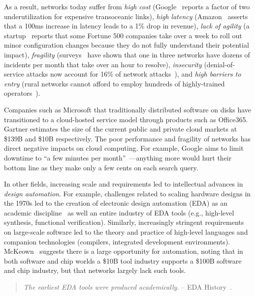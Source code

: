 As a result, networks today suffer from {\em high cost} (Google~\cite{b4} reports a factor of two underutilization for expensive transoceanic links), {\em high latency} (Amazon~\cite{amazon} asserts that a 100ms increase in latency leads to a 1\% drop in revenue), {\em lack of agility} (a startup~\cite{mahajan} reports that some Fortune 500 companies take over a week to roll out minor configuration changes because they do not fully understand their potential impact), {\em fragility} (surveys~\cite{atpg} have shown that one in three networks have dozens of incidents per month that take over an hour to resolve), {\em insecurity} (denial-of-service attacks now account for 16\% of network attacks~\cite{calyptix}), and {\em high barriers to entry} (rural networks cannot afford to employ hundreds of highly-trained operators~\cite{barathwisp}).

Companies such as Microsoft that traditionally distributed software on disks have transitioned to a cloud-hosted service model through products such as Office365. Gartner estimates the size of the current public and private cloud markets at \$139B and \$10B respectively. The poor performance and fragility of networks has direct negative impacts on cloud computing. For example, Google aims to limit downtime to ``a few minutes per month''~\cite{rameshgoogle}---anything more would hurt their bottom line as they make only a few cents on each search query. 

In other fields, increasing scale and requirements led to intellectual advances in \emph{design automation}. For example, challenges related to scaling hardware designs in the 1970s led to the creation of electronic design automation (EDA) as an academic discipline~\cite{alberto} as well an entire industry of EDA tools (e.g., high-level synthesis, functional verification). Similarly, increasingly stringent requirements on large-scale software led to the theory and practice of high-level languages and companion technologies (compilers, integrated development environments).   McKeown~\cite{mckeown} suggests there is a large opportunity for automation, noting that in both software and chip worlds a \$10B tool industry supports a \$100B software and chip industry, but that networks largely lack such tools. 


\begin{quote}
{\em The earliest EDA tools were produced academically.} -- EDA
History~\cite{wikicite2}.
\vspace{-2mm}
\end{quote}


